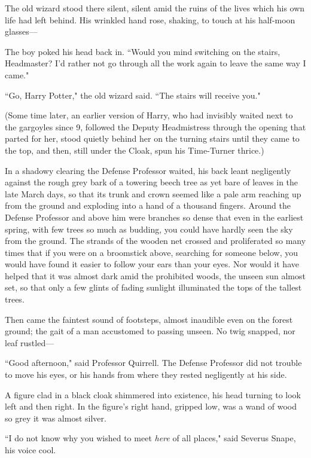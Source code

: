 The old wizard stood there silent, silent amid the ruins of the lives which his own life had left behind. His wrinkled hand rose, shaking, to touch at his half-moon glasses---

The boy poked his head back in. ``Would you mind switching on the stairs, Headmaster? I'd rather not go through all the work again to leave the same way I came."

``Go, Harry Potter," the old wizard said. ``The stairs will receive you."

(Some time later, an earlier version of Harry, who had invisibly waited next to the gargoyles since 9\pm, followed the Deputy Headmistress through the opening that parted for her, stood quietly behind her on the turning stairs until they came to the top, and then, still under the Cloak, spun his Time-Turner thrice.)


In a shadowy clearing the Defense Professor waited, his back leant negligently against the rough grey bark of a towering beech tree as yet bare of leaves in the late March days, so that its trunk and crown seemed like a pale arm reaching up from the ground and exploding into a hand of a thousand fingers. Around the Defense Professor and above him were branches so dense that even in the earliest spring, with few trees so much as budding, you could have hardly seen the sky from the ground. The strands of the wooden net crossed and proliferated so many times that if you were on a broomstick above, searching for someone below, you would have found it easier to follow your ears than your eyes. Nor would it have helped that it was almost dark amid the prohibited woods, the unseen sun almost set, so that only a few glints of fading sunlight illuminated the tops of the tallest trees.

Then came the faintest sound of footsteps, almost inaudible even on the forest ground; the gait of a man accustomed to passing unseen. No twig snapped, nor leaf rustled---

``Good afternoon," said Professor Quirrell. The Defense Professor did not trouble to move his eyes, or his hands from where they rested negligently at his side.

A figure clad in a black cloak shimmered into existence, his head turning to look left and then right. In the figure's right hand, gripped low, was a wand of wood so grey it was almost silver.

``I do not know why you wished to meet \emph{here} of all places," said Severus Snape, his voice cool.

